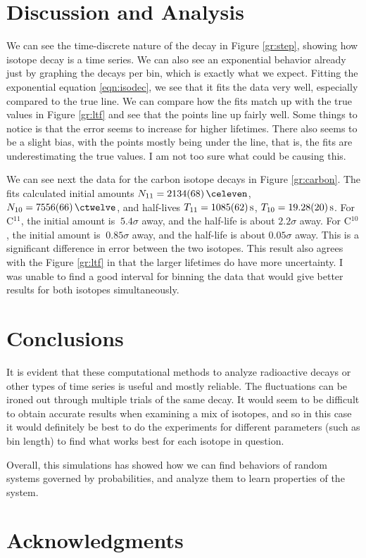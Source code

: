 \documentclass[aps,prl,twocolumn,superscriptaddress]{revtex4-1}
\begin{document}
\section{Discussion and Analysis}
We can see the time-discrete nature of the decay in Figure \ref{gr:step}, showing how isotope decay is a time series. We can also see an exponential behavior already just by graphing the decays per bin, which is exactly what we expect. Fitting the exponential equation \ref{eqn:isodec}, we see that it fits the data very well, especially compared to the true line. We can compare how the fits match up with the true values in Figure \ref{gr:ltf} and see that the points line up fairly well. Some things to notice is that the error seems to increase for higher lifetimes. There also seems to be a slight bias, with the points mostly being under the line, that is, the fits are underestimating the true values. I am not too sure what could be causing this.

We can see next the data for the carbon isotope decays in Figure \ref{gr:carbon}. The fits calculated initial amounts $N_{11} = \SI{2134 \pm 68}{\celeven}$, $N_{10} = \SI{7556 \pm 66}{\ctwelve}$, and half-lives $T_{11} = \SI{1085 \pm 62}{\s}$, $T_{10} = \SI{19.28 \pm .20}{\s}$. For C$^{11}$, the initial amount is $~5.4\sigma$ away, and the half-life is about $2.2\sigma$ away. For C$^{10}$, the initial amount is $~0.85\sigma$ away, and the half-life is about $0.05\sigma$ away. This is a significant difference in error between the two isotopes. This result also agrees with the Figure \ref{gr:ltf} in that the larger lifetimes do have more uncertainty. I was unable to find a good interval for binning the data that would give better results for both isotopes simultaneously. 

\section{Conclusions}
It is evident that these computational methods to analyze radioactive decays or other types of time series is useful and mostly reliable. The fluctuations can be ironed out through multiple trials of the same decay. It would seem to be difficult to obtain accurate results when examining a mix of isotopes, and so in this case it would definitely be best to do the experiments for different parameters (such as bin length) to find what works best for each isotope in question. 

Overall, this simulations has showed how we can find behaviors of random systems governed by probabilities, and analyze them to learn properties of the system. 

\section*{Acknowledgments}
\setlength{\parindent}{0cm}



\end{document}
